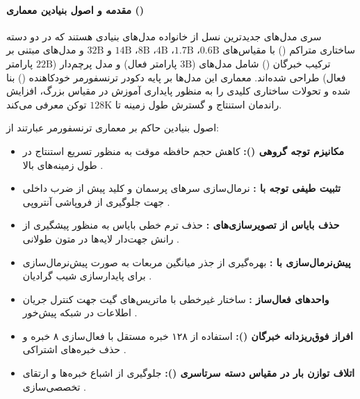\item {}

\paragraph*{مقدمه و اصول بنیادین معماری ()}
سری مدل‌های  \cite{qwen3techreport} جدیدترین نسل از خانواده مدل‌های بنیادی  هستند که در دو دسته ساختاری متراکم () با مقیاس‌های $0.6\text{B}$، $1.7\text{B}$، $4\text{B}$، $8\text{B}$، $14\text{B}$ و $32\text{B}$ و مدل‌های مبتنی بر ترکیب خبرگان () شامل مدل‌های  ($3\text{B}$ پارامتر فعال) و مدل پرچم‌دار  ($22\text{B}$ پارامتر فعال) طراحی شده‌اند. معماری این مدل‌ها بر پایه دکودر ترنسفورمر خودکاهنده () بنا شده و تحولات ساختاری کلیدی را به منظور پایداری آموزش در مقیاس بزرگ، افزایش راندمان استنتاج و گسترش طول زمینه تا $128\text{K}$ توکن معرفی می‌کند.

اصول بنیادین حاکم بر معماری ترنسفورمر  عبارتند از:
\begin{itemize}
    \item \textbf{مکانیزم توجه گروهی ():} کاهش حجم حافظه موقت  به منظور تسریع استنتاج در طول زمینه‌های بالا \cite{ainslie2023gqa}.
    \item \textbf{تثبیت طیفی توجه با :} نرمال‌سازی سرهای پرسمان و کلید پیش از ضرب داخلی جهت جلوگیری از فروپاشی آنتروپی \cite{dehghani2023scaling}.
    \item \textbf{حذف بایاس از تصویرسازی‌های :} حذف ترم خطی بایاس به منظور پیشگیری از رانش جهت‌دار لایه‌ها در متون طولانی \cite{yang2024qwen2}.
    \item \textbf{پیش‌نرمال‌سازی با :} بهره‌گیری از جذر میانگین مربعات به صورت پیش‌نرمال‌سازی برای پایدارسازی شیب گرادیان \cite{jiang2023prermsnorm}.
    \item \textbf{واحدهای فعال‌ساز :} ساختار غیرخطی با ماتریس‌های گیت جهت کنترل جریان اطلاعات در شبکه پیش‌خور \cite{dauphin2017language}.
    \item \textbf{افراز فوق‌ریزدانه خبرگان ():} استفاده از ۱۲۸ خبره مستقل با فعال‌سازی ۸ خبره و حذف خبره‌های اشتراکی \cite{dai2024deepseekmoe}.
    \item \textbf{اتلاف توازن بار در مقیاس دسته سرتاسری ():} جلوگیری از اشباع خبره‌ها و ارتقای تخصصی‌سازی \cite{qiu2025demons}.
\end{itemize}

